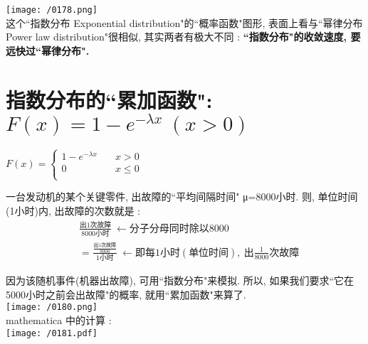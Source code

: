 \documentclass[UTF8]{ctexart}
\begin{document}
 \texttt{[image: /0178.png]} \\


这个``指数分布 Exponential distribution"的``概率函数"图形, 表面上看与``幂律分布 Power law distribution"很相似, 其实两者有极大不同 : \textbf{``指数分布"的收敛速度, 要远快过``幂律分布".} \\







\section{指数分布的``累加函数": $\boxed {F(x)=1-e^{-\lambda x}\ (x>0)}$}

$\boxed{
F(x) = \begin{cases}
	1- e^{-λx} & \quad x>0 \\
	0 &  \quad x \leq 0  \\
\end{cases} }$ \\
\vspace{1em} 


\begin{myEnvSample}
一台发动机的某个关键零件, 出故障的``平均间隔时间" μ=8000小时. 则, 单位时间(1小时)内, 出故障的次数就是 :
\begin{align*}  %
	&\frac{\text{出1次故障}}{8000\text{小时}}\ \gets \text{分子分母同时除以}8000\\
&=\frac{\frac{\text{出1次故障}}{8000}}{1\text{小时}}\ \gets \text{即每1小时}(\text{单位时间}),\ \text{出}\frac{1}{8000}\text{次故障}
\end{align*}

因为该随机事件(机器出故障), 可用``指数分布"来模拟. 所以, 如果我们要求``它在5000小时之前会出故障"的概率, 就用``累加函数"来算了. \\

\texttt{[image: /0180.png]} \\

mathematica 中的计算 : \\
\texttt{[image: /0181.pdf]} 
\end{myEnvSample}
\vspace{1em} 
\end{document}
